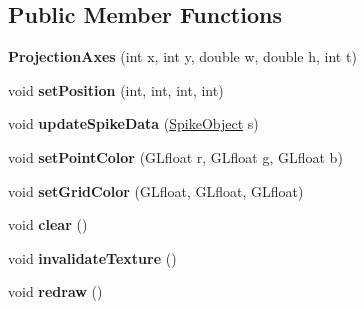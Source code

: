 \subsection*{Public Member Functions}
\begin{DoxyCompactItemize}
\item 
\hypertarget{classProjectionAxes_acfda67974323b9c7d71cc5825e8aaa4d}{{\bfseries Projection\-Axes} (int x, int y, double w, double h, int t)}\label{classProjectionAxes_acfda67974323b9c7d71cc5825e8aaa4d}

\item 
\hypertarget{classProjectionAxes_ad5542f2256adb9c782d1a8025c2ace37}{void {\bfseries set\-Position} (int, int, int, int)}\label{classProjectionAxes_ad5542f2256adb9c782d1a8025c2ace37}

\item 
\hypertarget{classProjectionAxes_adaeb9de4f99cfc73d2d79ddeb2c867db}{void {\bfseries update\-Spike\-Data} (\hyperlink{structSpikeObject}{Spike\-Object} s)}\label{classProjectionAxes_adaeb9de4f99cfc73d2d79ddeb2c867db}

\item 
\hypertarget{classProjectionAxes_a8e1e5c29651418d405afa93880c24399}{void {\bfseries set\-Point\-Color} (G\-Lfloat r, G\-Lfloat g, G\-Lfloat b)}\label{classProjectionAxes_a8e1e5c29651418d405afa93880c24399}

\item 
\hypertarget{classProjectionAxes_ad3c22e6128ba905240b7b7e0b630faf5}{void {\bfseries set\-Grid\-Color} (G\-Lfloat, G\-Lfloat, G\-Lfloat)}\label{classProjectionAxes_ad3c22e6128ba905240b7b7e0b630faf5}

\item 
\hypertarget{classProjectionAxes_adae3c04c3a1847bee1105474380fff02}{void {\bfseries clear} ()}\label{classProjectionAxes_adae3c04c3a1847bee1105474380fff02}

\item 
\hypertarget{classProjectionAxes_a483416ad6a461383c148504857d96fce}{void {\bfseries invalidate\-Texture} ()}\label{classProjectionAxes_a483416ad6a461383c148504857d96fce}

\item 
\hypertarget{classProjectionAxes_a42d89f47f6bb4dee062a190d1fa54aa3}{void {\bfseries redraw} ()}\label{classProjectionAxes_a42d89f47f6bb4dee062a190d1fa54aa3}

\end{DoxyCompactItemize}
